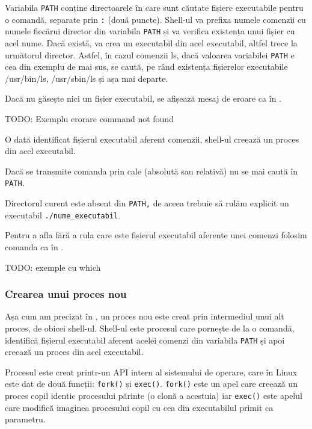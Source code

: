 Variabila \texttt{PATH} conține directoarele în care sunt căutate fișiere executabile
pentru o comandă, separate prin \texttt{:} (două puncte). Shell-ul va prefixa numele
comenzii cu numele fiecărui director din variabila \texttt{PATH} și va verifica existența
unui fișier cu acel nume. Dacă există, va crea un executabil din acel
executabil, altfel trece la următorul director. Astfel, în cazul comenzii ls,
dacă valoarea variabilei \texttt{PATH} e cea din exemplu de mai sus, se caută, pe rând
existența fișierelor executabile /usr/bin/ls, /usr/sbin/ls și așa mai departe.

Dacă nu găsește nici un fișier executabil, se afișează mesaj de eroare ca în .

\begin{screen}[caption={Eroare localizare fișier executabil},label={lst:cli:path-error}]
TODO: Exemplu erorare command not found
\end{screen}

O dată identificat fișierul executabil aferent comenzii, shell-ul creează un proces
din acel executabil.

Dacă se transmite comanda prin cale (absolută sau relativă) nu se mai caută în
\texttt{PATH}.

Directorul curent este absent din \texttt{PATH,} de aceea trebuie să rulăm explicit un
executabil \texttt{./nume\_executabil}.

Pentru a afla fără a rula care este fișierul executabil aferente unei comenzi
folosim comanda  ca în .

\begin{screen}[caption={Aflarea executabilului unei comenzi (which)},label={lst:cli:which}]
TODO: exemple cu which
\end{screen}

\subsubsection{Crearea unui proces nou}
\label{sec:cli-new-process}

Așa cum am precizat în , un proces nou este creat prin intermediul unui alt
proces, de obicei shell-ul. Shell-ul este procesul care pornește de la o
comandă, identifică fișierul executabil aferent acelei comenzi din variabila
\texttt{PATH} și apoi creează un proces din acel executabil.

Procesul este creat printr-un API intern al sistemului de operare, care în Linux
este dat de două funcții: \texttt{fork()} și \texttt{exec()}. \texttt{fork()} este un apel care creează un
proces copil identic procesului părinte (o clonă a acestuia) iar \texttt{exec()} este
apelul care modifică imaginea procesului copil cu cea din executabilul primit ca
parametru.

